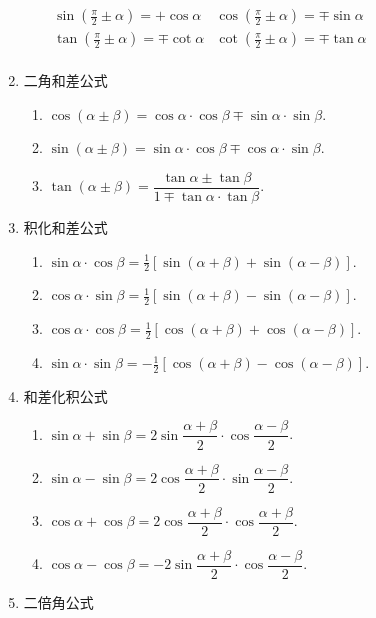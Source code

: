 \documentclass[lang=cn,10pt]{elegantbook}
\begin{document}
\begin{enumerate}
\begin{enumerate}
		\(
			\begin{array}{ll}
				\sin(\frac{\pi}{2} \pm \alpha) = + \cos\alpha & \cos(\frac{\pi}{2} \pm \alpha) = \mp \sin \alpha \\
				\tan(\frac{\pi}{2} \pm \alpha) = \mp \cot\alpha & \cot(\frac{\pi}{2} \pm \alpha) = \mp\tan\alpha \\
			\end{array}
		\)
	\end{enumerate}
	\item 二角和差公式
	\begin{enumerate}
		\item \( \cos (\alpha \pm \beta) = \cos\alpha\cdot\cos\beta \mp \sin\alpha\cdot\sin\beta \).
		\item \( \sin(\alpha \pm \beta) = \sin\alpha\cdot\cos\beta \mp \cos\alpha\cdot\sin\beta \).
		\item \( \tan(\alpha \pm \beta) = \displaystyle\dfrac{\tan\alpha \pm \tan\beta}{1 \mp \tan\alpha\cdot\tan\beta} \).
	\end{enumerate}
	\item 积化和差公式
	\begin{enumerate}
		\item \( \sin\alpha\cdot\cos\beta = \frac{1}{2}[\sin(\alpha + \beta) + \sin(\alpha - \beta)] \).
		\item \( \cos\alpha\cdot\sin\beta = \frac{1}{2}[\sin(\alpha + \beta) - \sin(\alpha - \beta)] \).
		\item \( \cos\alpha\cdot\cos\beta = \frac{1}{2}[\cos(\alpha + \beta) + \cos(\alpha - \beta)] \).
		\item \( \sin\alpha\cdot\sin\beta = -\frac{1}{2}[\cos(\alpha + \beta) - \cos(\alpha - \beta)] \).
	\end{enumerate}
	\item 和差化积公式
	\begin{enumerate}
		\item \( \sin\alpha + \sin\beta = 2\sin\dfrac{\alpha + \beta}{2} \cdot \cos\dfrac{\alpha - \beta}{2} \).
		\item \( \sin\alpha - \sin\beta = 2\cos\dfrac{\alpha + \beta}{2} \cdot \sin\dfrac{\alpha - \beta}{2} \).
		\item \( \cos\alpha + \cos\beta = 2\cos\dfrac{\alpha + \beta}{2} \cdot \cos\dfrac{\alpha + \beta}{2} \).
		\item \( \cos\alpha - \cos\beta = -2\sin\dfrac{\alpha + \beta}{2} \cdot \cos\dfrac{\alpha - \beta}{2} \).
	\end{enumerate}
	\item 二倍角公式

\end{enumerate}
\end{document}
